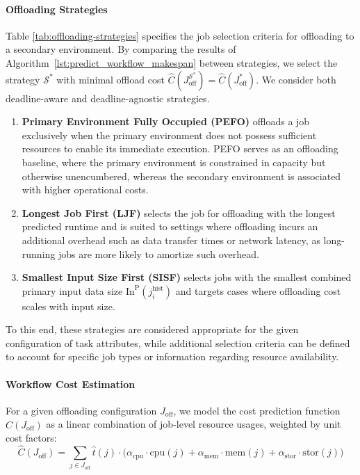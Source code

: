 \paragraph{Offloading Strategies}\label{par:offloading-strategies}

Table \ref{tab:offloading-strategies} specifies the job selection criteria for offloading to a secondary environment. By comparing the results of Algorithm~\ref{lst:predict_workflow_makespan} between strategies, we select the strategy $\mathcal{S^*}$ with minimal offload cost $\hat{C}(J^{\mathcal{S^*}}_{\text{off}})=\hat{C}(J^{*}_{\text{off}})$. We consider both deadline-aware and deadline-agnostic strategies.

\begin{enumerate}

    \item \textbf{Primary Environment Fully Occupied (PEFO)} offloads a job exclusively when the primary environment does not possess sufficient resources to enable its immediate execution. PEFO serves as an offloading baseline, where the primary environment is constrained in capacity but otherwise unencumbered, whereas the secondary environment is associated with higher operational costs.
    \item \textbf{Longest Job First (LJF)} selects the job for offloading with the longest predicted runtime and is suited to settings where offloading incurs an additional overhead such as data transfer times or network latency, as long-running jobs are more likely to amortize such overhead. 
    \item \textbf{Smallest Input Size First (SISF)} selects jobs with the smallest combined primary input data size $\text{In}^\text{P}(j_i^\text{hist})$ and targets cases where offloading cost scales with input size. 
\end{enumerate}

To this end, these strategies are considered appropriate for the given configuration of task attributes, while additional selection criteria can be defined to account for specific job types or information regarding resource availability.

\paragraph{Workflow Cost Estimation}\label{par:cost-estimation}
For a given offloading configuration $J_{\text{off}}$, we model the cost prediction function $\hat{C}(J_{\text{off}})$ as a linear combination of job-level resource usages, weighted by unit cost factors:
\[
\hat{C}(J_{\text{off}}) = \sum_{j \in J_{\text{off}}} \hat{t}(j) \cdot \big(
\alpha_{\text{cpu}} \cdot \text{cpu}(j) +
\alpha_{\text{mem}} \cdot \text{mem}(j) +
\alpha_{\text{stor}} \cdot \text{stor}(j)
\big)
\]

